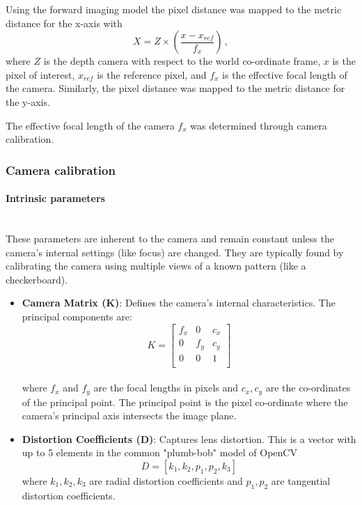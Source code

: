 Using the forward imaging model the pixel distance was mapped to the metric distance for the x-axis with
\begin{equation}
    X = Z \times \left( \frac{x - x_{ref}}{f_x} \right)\,,
    \label{eq:pixel_to_metric}
\end{equation}
where $Z$ is the depth camera with respect to the world co-ordinate frame, $x$ is the pixel of interest, $x_{ref}$ is the reference pixel, and $f_x$ is the effective focal length of the camera. Similarly, the pixel distance was mapped to the metric distance for the y-axis.

The effective focal length of the camera $f_x$ was determined through camera calibration.

\subsubsection{Camera calibration}
\paragraph{Intrinsic parameters}\mbox{}\\
These parameters are inherent to the camera and remain constant unless the camera's internal settings (like focus) are changed. They are typically found by calibrating the camera using multiple views of a known pattern (like a checkerboard).

\begin{itemize}
    \item \textbf{Camera Matrix (K)}: Defines the camera's internal characteristics. The principal components are:
          \begin{equation}
              K = \begin{bmatrix}
                  f_x & 0   & c_x \\
                  0   & f_y & c_y \\
                  0   & 0   & 1   \\
              \end{bmatrix}
          \end{equation}\\
          where $f_x$ and $f_y$ are the focal lengths in pixels and $c_x, c_y$ are the co-ordinates of the principal point. The principal point is the pixel co-ordinate where the camera's principal axis intersects the image plane.

    \item \textbf{Distortion Coefficients (D)}: Captures lens distortion. This is a vector with up to 5 elements in the common "plumb-bob" model of OpenCV
          \[
              D = [k_1, k_2, p_1, p_2, k_3]
          \]
          where $k_1, k_2, k_3$ are radial distortion coefficients and $p_1, p_2$ are tangential distortion coefficients.
\end{itemize}

